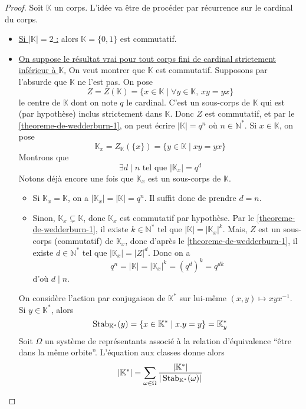   \begin{proof}
    Soit $\mathbb{K}$ un corps. L'idée va être de procéder par récurrence sur le cardinal du corps.
    \begin{itemize}
      \item \uline{Si $|\mathbb{K}| = 2$ :} alors $\mathbb{K} = \{0, 1\}$ est commutatif.
      \item \uline{On suppose le résultat vrai pour tout corps fini de cardinal strictement inférieur à $\mathbb{K}$.} On veut montrer que $\mathbb{K}$ est commutatif. Supposons par l'absurde que $\mathbb{K}$ ne l'est pas. On pose
      \[ Z = Z(\mathbb{K}) = \{ x \in \mathbb{K} \mid \forall y \in \mathbb{K}, \, xy = yx \} \]
      le centre de $\mathbb{K}$ dont on note $q$ le cardinal. C'est un sous-corps de $\mathbb{K}$ qui est (par hypothèse) inclus strictement dans $\mathbb{K}$. Donc $Z$ est commutatif, et par le \cref{theoreme-de-wedderburn-1}, on peut écrire $|\mathbb{K}| = q^n$ où $n \in \mathbb{N}^*$. Si $x \in \mathbb{K}$, on pose
      \[ \mathbb{K}_x = Z_{\mathbb{K}}(\{ x \}) = \{ y \in \mathbb{K} \mid xy = yx \} \]
      Montrons que
      \[ \exists d \mid n \text{ tel que } |\mathbb{K}_x| = q^d \tag{$*$} \]
      Notons déjà encore une fois que $\mathbb{K}_x$ est un sous-corps de $\mathbb{K}$.
      \begin{itemize}
        \item Si $\mathbb{K}_x = \mathbb{K}$, on a $|\mathbb{K}_x| = |\mathbb{K}| = q^n$. Il suffit donc de prendre $d = n$.
        \item Sinon, $\mathbb{K}_x \subsetneq \mathbb{K}$, donc $\mathbb{K}_x$ est commutatif par hypothèse. Par le \cref{theoreme-de-wedderburn-1}, il existe $k \in \mathbb{N}^*$ tel que $|\mathbb{K}| = |\mathbb{K}_x|^k$.
        \newpar
        Mais, $Z$ est un sous-corps (commutatif) de $\mathbb{K}_x$, donc d'après le \cref{theoreme-de-wedderburn-1}, il existe $d \in \mathbb{N}^*$ tel que $|\mathbb{K}_x| = |Z|^d$. Donc on a
        \[ q^n = |\mathbb{K}| = |\mathbb{K}_x|^k = (q^d)^k = q^{dk} \]
        d'où $d \mid n$.
      \end{itemize}
      On considère l'action par conjugaison de $\mathbb{K}^*$ sur lui-même $(x, y) \mapsto xyx^{-1}$. Si $y \in \mathbb{K}^*$, alors
      \[ \operatorname{Stab}_{\mathbb{K}^*}(y) = \{ x \in \mathbb{K}^* \mid x.y = y \} = \mathbb{K}_y^* \]
      Soit $\Omega$ un système de représentants associé à la relation d'équivalence ``être dans la même orbite''. L'équation aux classes donne alors
      \[ |\mathbb{K}^*| = \sum_{\omega \in \Omega} \frac{|\mathbb{K}^*|}{|\operatorname{Stab}_{\mathbb{K}^*}(\omega)|} \]

\end{itemize}
\end{proof}

